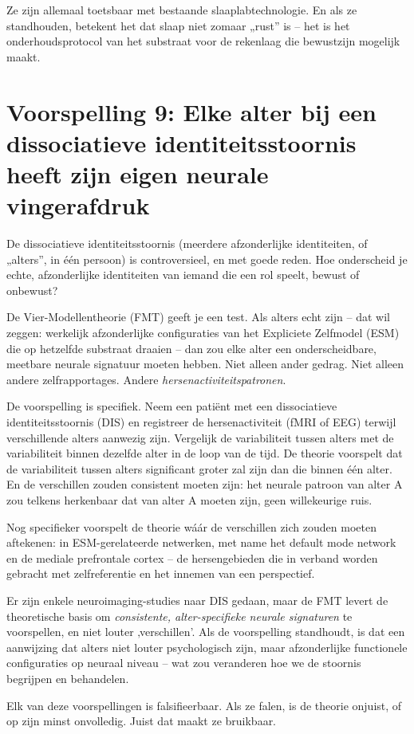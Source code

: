 \documentclass[11pt, twoside, openright]{book}
\begin{document}
Ze zijn allemaal toetsbaar met bestaande slaaplabtechnologie. En als ze standhouden, betekent het dat slaap niet zomaar „rust” is -- het is het onderhoudsprotocol van het substraat voor de rekenlaag die bewustzijn mogelijk maakt.

\section*{Voorspelling 9: Elke alter bij een dissociatieve identiteitsstoornis heeft zijn eigen neurale vingerafdruk}

De dissociatieve identiteitsstoornis (meerdere afzonderlijke identiteiten, of „alters”, in één persoon) is controversieel, en met goede reden. Hoe onderscheid je echte, afzonderlijke identiteiten van iemand die een rol speelt, bewust of onbewust?

De Vier-Modellentheorie (FMT) geeft je een test. Als alters echt zijn -- dat wil zeggen: werkelijk afzonderlijke configuraties van het Expliciete Zelfmodel (ESM) die op hetzelfde substraat draaien -- dan zou elke alter een onderscheidbare, meetbare neurale signatuur moeten hebben. Niet alleen ander gedrag. Niet alleen andere zelfrapportages. Andere \textit{hersenactiviteitspatronen}.

De voorspelling is specifiek. Neem een patiënt met een dissociatieve identiteitsstoornis (DIS) en registreer de hersenactiviteit (fMRI of EEG) terwijl verschillende alters aanwezig zijn. Vergelijk de variabiliteit tussen alters met de variabiliteit binnen dezelfde alter in de loop van de tijd. De theorie voorspelt dat de variabiliteit tussen alters significant groter zal zijn dan die binnen één alter. En de verschillen zouden consistent moeten zijn: het neurale patroon van alter A zou telkens herkenbaar dat van alter A moeten zijn, geen willekeurige ruis.

Nog specifieker voorspelt de theorie wáár de verschillen zich zouden moeten aftekenen: in ESM-gerelateerde netwerken, met name het default mode network en de mediale prefrontale cortex -- de hersengebieden die in verband worden gebracht met zelfreferentie en het innemen van een perspectief.

Er zijn enkele neuroimaging-studies naar DIS gedaan, maar de FMT levert de theoretische basis om \textit{consistente, alter-specifieke neurale signaturen} te voorspellen, en niet louter ‚verschillen'. Als de voorspelling standhoudt, is dat een aanwijzing dat alters niet louter psychologisch zijn, maar afzonderlijke functionele configuraties op neuraal niveau -- wat zou veranderen hoe we de stoornis begrijpen en behandelen.

Elk van deze voorspellingen is falsifieerbaar. Als ze falen, is de theorie onjuist, of op zijn minst onvolledig. Juist dat maakt ze bruikbaar.
\end{document}
